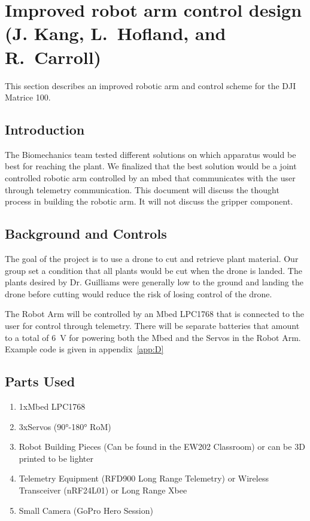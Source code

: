 \section{Improved robot arm control design (J. Kang, L.~Hofland, and R.~Carroll)}
\label{sec:robotarm}

This section describes an improved robotic arm and control scheme for the DJI Matrice 100.

\subsection{Introduction}
The Biomechanics team tested different solutions on which apparatus would be best for reaching the plant. We finalized that the best solution would be a joint controlled robotic arm controlled by an mbed that communicates with the user through telemetry communication. This document will discuss the thought process in building the robotic arm. It will not discuss the gripper component.

\subsection{Background and Controls}
The goal of the project is to use a drone to cut and retrieve plant material. Our group set a condition that all plants would be cut when the drone is landed. The plants desired by Dr. Guilliams were generally low to the ground and landing the drone before cutting would reduce the risk of losing control of the drone. 

The Robot Arm will be controlled by an Mbed LPC1768 that is connected to the user for control through telemetry. There will be separate batteries that amount to a total of \SI{6}{\volt} for powering both the Mbed and the Servos in the Robot Arm. Example code is given in appendix~\ref{app:D}

\subsection{Parts Used}
\begin{enumerate}
\item 1xMbed LPC1768
\item 3xServos (\ang{90}-\ang{180} RoM)
\item Robot Building Pieces (Can be found in the EW202 Classroom) or can be 3D printed to be lighter
\item Telemetry Equipment (RFD900 Long Range Telemetry) or Wireless Transceiver (nRF24L01) or Long Range Xbee
\item Small Camera (GoPro Hero Session)
\end{enumerate}

